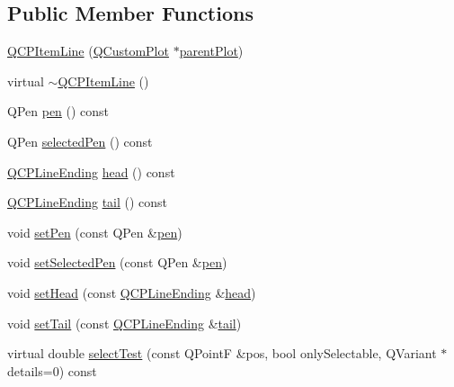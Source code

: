 \subsection*{Public Member Functions}
\begin{DoxyCompactItemize}
\item 
\hyperlink{class_q_c_p_item_line_a17804b7f64961c6accf25b61e85142e3}{Q\+C\+P\+Item\+Line} (\hyperlink{class_q_custom_plot}{Q\+Custom\+Plot} $\ast$\hyperlink{class_q_c_p_layerable_ab7e0e94461566093d36ffc0f5312b109}{parent\+Plot})
\item 
virtual \hyperlink{class_q_c_p_item_line_a94b5aaae048171e5306dc4695b991283}{$\sim$\+Q\+C\+P\+Item\+Line} ()
\item 
Q\+Pen \hyperlink{class_q_c_p_item_line_a235779dd079a263bedb20b3daecc40eb}{pen} () const 
\item 
Q\+Pen \hyperlink{class_q_c_p_item_line_a9fde5e95a1a369008252e18f1925650c}{selected\+Pen} () const 
\item 
\hyperlink{class_q_c_p_line_ending}{Q\+C\+P\+Line\+Ending} \hyperlink{class_q_c_p_item_line_a5f6cbc5c763feae9dfbce71748fc43f1}{head} () const 
\item 
\hyperlink{class_q_c_p_line_ending}{Q\+C\+P\+Line\+Ending} \hyperlink{class_q_c_p_item_line_a5d2ca0f784933e80f3e6e1d15dceebb3}{tail} () const 
\item 
void \hyperlink{class_q_c_p_item_line_a572528dab61c1abe205822fbd5db4b27}{set\+Pen} (const Q\+Pen \&\hyperlink{class_q_c_p_item_line_a235779dd079a263bedb20b3daecc40eb}{pen})
\item 
void \hyperlink{class_q_c_p_item_line_a3e2fec44503277e77717e9c24f87f1ea}{set\+Selected\+Pen} (const Q\+Pen \&\hyperlink{class_q_c_p_item_line_a235779dd079a263bedb20b3daecc40eb}{pen})
\item 
void \hyperlink{class_q_c_p_item_line_aebf3d687114d584e0459db6759e2c3c3}{set\+Head} (const \hyperlink{class_q_c_p_line_ending}{Q\+C\+P\+Line\+Ending} \&\hyperlink{class_q_c_p_item_line_a5f6cbc5c763feae9dfbce71748fc43f1}{head})
\item 
void \hyperlink{class_q_c_p_item_line_ac264222c3297a7efe33df9345c811a5f}{set\+Tail} (const \hyperlink{class_q_c_p_line_ending}{Q\+C\+P\+Line\+Ending} \&\hyperlink{class_q_c_p_item_line_a5d2ca0f784933e80f3e6e1d15dceebb3}{tail})
\item 
virtual double \hyperlink{class_q_c_p_item_line_a7541e5d9378ca121d07b0df3b24f7178}{select\+Test} (const Q\+Point\+F \&pos, bool only\+Selectable, Q\+Variant $\ast$details=0) const 
\end{DoxyCompactItemize}
